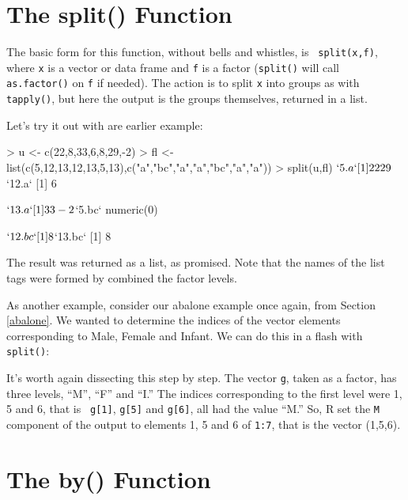 \section{The split() Function}
\label{split}

The basic form for this function, without bells and whistles, is {\tt
split(x,f)}, where {\tt x} is a vector or data frame and {\tt f} is a
factor ({\tt split()} will call {\tt as.factor()} on {\tt f} if needed).
The action is to split {\tt x} into groups as with {\tt tapply()}, but
here the output is the groups themselves, returned in a list.

Let's try it out with are earlier example:

\begin{Code}
> u <- c(22,8,33,6,8,29,-2)
> fl <- list(c(5,12,13,12,13,5,13),c("a","bc","a","a","bc","a","a"))
> split(u,fl)
$`5.a`
[1] 22 29

$`12.a`
[1] 6

$`13.a`
[1] 33 -2

$`5.bc`
numeric(0)

$`12.bc`
[1] 8

$`13.bc`
[1] 8
\end{Code}

\noindent
The result was returned as a list, as promised.  Note that the names of
the list tags were formed by combined the factor levels.

As another example, consider our abalone example once again, from Section
\ref{abalone}.  We wanted to determine the indices of the vector
elements corresponding to Male, Female and Infant.  We can do this in a
flash with {\tt split()}:


It's worth again dissecting this step by step.  The vector {\tt g},
taken as a factor, has three levels, ``M'', ``F'' and ``I.''  The
indices corresponding to the first level were 1, 5 and 6, that is {\tt
g[1]}, {\tt g[5]} and {\tt g[6]}, all had the value ``M.''  So, R set
the {\tt M} component of the output to elements 1, 5 and 6 of {\tt 1:7},
that is the vector (1,5,6).

\section{The by() Function}

